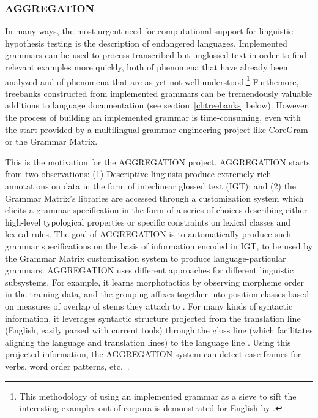 \documentclass[output=paper,nonflat]{langsci/langscibook}
\begin{document}
\subsubsection{AGGREGATION}

In many ways, the most urgent need for computational support for
linguistic hypothesis testing is the description of endangered
languages. Implemented grammars can be used to process transcribed but
unglossed text in order to find relevant examples more quickly, both
of phenomena that have already been analyzed and of phenomena that are
as yet not well-understood.\footnote{This methodology of using an
  implemented grammar as a sieve to sift the interesting examples out
  of corpora is demonstrated for English by \cite{Baldwin-et-al-05}.}
Furthemore, treebanks constructed from implemented grammars can be
tremendously valuable additions to language documentation (see
section~\ref{cl:treebanks} below). However, the process of building an
implemented grammar is time-consuming, even with the start provided by
a multilingual grammar engineering project like CoreGram or the
Grammar Matrix.

This is the motivation for the AGGREGATION project. AGGREGATION starts
from two observations: (1) Descriptive linguists produce extremely
rich annotations on data in the form of interlinear glossed text
(IGT); and (2) the Grammar Matrix's libraries are accessed through a
customization system which elicits a grammar specification in the form
of a series of choices describing either high-level typological
properties or specific constraints on lexical classes and lexical
rules.  The goal of AGGREGATION is to automatically produce such
grammar specifications on the basis of information encoded in IGT, to
be used by the Grammar Matrix customization system to produce
language-particular grammars. AGGREGATION uses different approaches
for different linguistic subsystems. For example, it learns
morphotactics by observing morpheme order in the training data, and
the grouping affixes together into position classes based on measures
of overlap of stems they attach to \citep{Wax:14,Zamaraeva:17}. For
many kinds of syntactic information, it leverages syntactic structure
projected from the translation line (English, easily parsed with
current tools) through the gloss line (which facilitates aligning the
language and translation lines) to the language line
\citep{Xia:Lew:07,Georgi:16}. Using this projected information, the
AGGREGATION system can detect case frames for verbs, word order
patterns, etc.\ \citep{Ben:Goo:Cro:Xia:13,Zam:How:Ben:19}.
\end{document}
